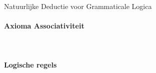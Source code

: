 \begin{figure}[ht]
\begin{theorem}\label{th:nd-gl} Natuurlijke Deductie voor Grammaticale Logica
\paragraph{Axioma \hspace{15mm} Associativiteit}\mbox{}\\[3mm]
\hspace{8mm}

\paragraph{Logische regels}\mbox{}\\[3mm]

\noindent{}
\hspace{5mm}

\vspace{4mm}

\hspace{5mm}

\vspace{4mm}

\hspace{5mm}
\end{theorem}
\end{figure}


